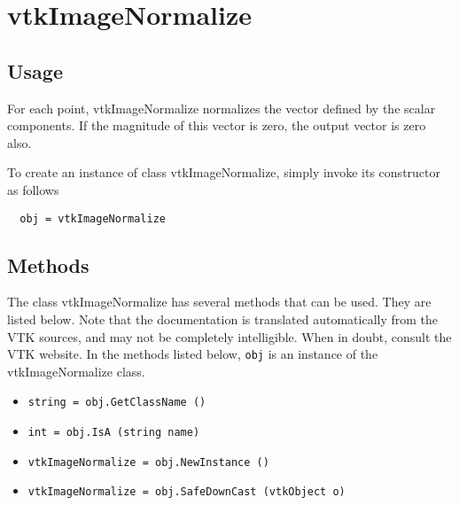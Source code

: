 \section{vtkImageNormalize}

\subsection{Usage}

 For each point, vtkImageNormalize normalizes the vector defined by the 
 scalar components.  If the magnitude of this vector is zero, the output
 vector is zero also.

To create an instance of class vtkImageNormalize, simply
invoke its constructor as follows
\begin{verbatim}
  obj = vtkImageNormalize
\end{verbatim}
\subsection{Methods}

The class vtkImageNormalize has several methods that can be used.
  They are listed below.
Note that the documentation is translated automatically from the VTK sources,
and may not be completely intelligible.  When in doubt, consult the VTK website.
In the methods listed below, \verb|obj| is an instance of the vtkImageNormalize class.
\begin{itemize}
\item  \verb|string = obj.GetClassName ()|

\item  \verb|int = obj.IsA (string name)|

\item  \verb|vtkImageNormalize = obj.NewInstance ()|

\item  \verb|vtkImageNormalize = obj.SafeDownCast (vtkObject o)|

\end{itemize}

